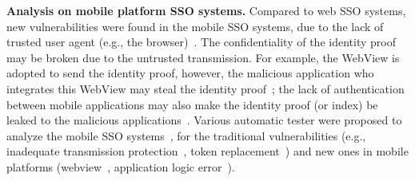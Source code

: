 \begin{comment}
\end{comment}

\noindent\textbf{Analysis on mobile platform SSO systems.} Compared to web SSO systems, new vulnerabilities were found in the mobile SSO systems, due to the lack of trusted user agent (e.g., the browser)~\cite{WangZLLYLG15,MohsenS16}. The confidentiality of the identity proof may be broken due to the untrusted transmission. For example, the WebView is adopted to send the identity proof, however, the malicious application who integrates this WebView may steal the identity proof~\cite{MohsenS16}; the lack of authentication  between mobile applications may also make the identity proof (or index) be leaked to the malicious applications~\cite{WangZLLYLG15}.
Various automatic tester were proposed to analyze the mobile SSO systems~\cite{MohsenS16,WangZLLYLG15,WangZLG16,YangLS17,ShiWL19}, for the traditional  vulnerabilities (e.g., inadequate transmission protection~\cite{WangZLLYLG15}, token replacement~\cite{ShiWL19}) and new ones in mobile platforms (webview~\cite{MohsenS16}, application logic error~\cite{YangLS17}).

